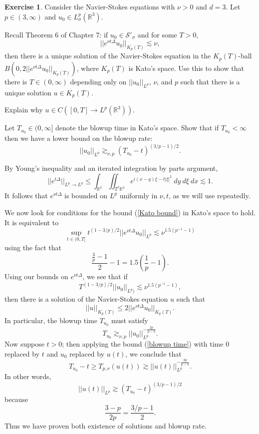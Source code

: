 \documentclass[10pt]{article}
\newcommand{\RR}{\mathbb{R}}
\newcommand{\Sch}{\mathcal{S}}
\theoremstyle{definition}
\newtheorem{exer}{Exercise}
\begin{document}
\begin{exer}
Consider the Navier-Stokes equations with $\nu > 0$ and $d = 3$. Let $p \in (3, \infty)$ and $u_0 \in L^p_\sigma(\RR^3)$.

Recall Theorem 6 of Chapter 7: if $u_0 \in \Sch'_\sigma$ and for some $T > 0$,
\begin{equation}
\label{Kato bound}
||e^{\nu t\Delta} u_0||_{K_p(T)} \lesssim \nu,
\end{equation}
then there is a unique solution of the Navier-Stokes equation in the $K_p(T)$-ball $B(0, 2||e^{\nu t\Delta} u_0||_{K_p(T)})$, where $K_p(T)$ is Kato's space.
Use this to show that there is $T \in (0, \infty)$ depending only on $||u_0||_{L^p}$, $\nu$, and $p$ such that there is a unique solution $u \in K_p(T)$.

Explain why $u \in C([0, T] \to L^p(\RR^3))$.

Let $T_{u_0} \in (0, \infty]$ denote the blowup time in Kato's space. Show that if $T_{u_0} < \infty$ then we have a lower bound on the blowup rate:
$$||u_0||_{L^p} \gtrsim_{\nu, p} (T_{u_0} - t)^{(3/p - 1)/2}.$$
\end{exer}

By Young's inequality and an iterated integration by parts argument,
$$||e^{t\Delta}||_{L^p \to L^p} \leq \int_{\RR^3} \iint_{T^*\RR^3} e^{i(x-y)\xi - t|\xi|^2} ~dy ~d\xi ~dx \lesssim 1.$$
It follows that $e^{\nu t\Delta}$ is bounded on $L^p$ uniformly in $\nu,t$, as we will use repeatedly.

We now look for conditions for the bound (\ref{Kato bound}) in Kato's space to hold. It is equivalent to
$$\sup_{t \in (0, T]} t^{(1 - 3/p)/2} ||e^{\nu t\Delta} u_0||_{L^p} \lesssim \nu^{1.5(p^{-1} - 1)}$$
using the fact that
$$\frac{\frac{3}{p} - 1}{2} - 1 = 1.5\left(\frac{1}{p} - 1\right).$$
Using our bounds on $e^{\nu t\Delta}$, we see that if
$$T^{(1 - 3/p)/2} ||u_0||_{L^p)} \lesssim \nu^{1.5(p^{-1} - 1)},$$
then there is a solution of the Navier-Stokes equation $u$ such that
$$||u||_{K_p(T)} \leq 2||e^{\nu t\Delta} u_0||_{K_p(T)}.$$
In particular, the blowup time $T_{u_0}$ must satisfy
\begin{equation}
\label{blowup time}
T_{u_0} \gtrsim_{\nu,p} ||u_0||_{L^p}^{-\frac{2p}{p-3}}.
\end{equation}
Now suppose $t > 0$; then applying the bound (\ref{blowup time}) with time $0$ replaced by $t$ and $u_0$ replaced by $u(t)$, we conclude that
$$T_{u_0} - t \geq T_{p,\nu}(u(t)) \gtrsim ||u(t)||_{L^p}^{-\frac{2p}{p - 3}}.$$
In other words,
$$||u(t)||_{L^p} \gtrsim (T_{u_0} - t)^{(3/p-1)/2}$$
because
$$\frac{3 - p}{2p} = \frac{3/p - 1}{2}.$$
Thus we have proven both existence of solutions and blowup rate.
\end{document}
